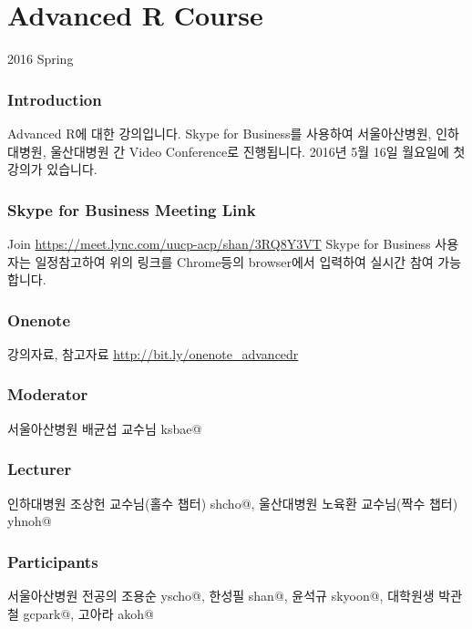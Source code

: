 \documentclass[]{article}
\title{}
\author{}
\date{}
\begin{document}
\section{Advanced R Course}\label{advanced-r-course}

2016 Spring

\subsubsection{Introduction}\label{introduction}

Advanced R에 대한 강의입니다. Skype for Business를 사용하여
서울아산병원, 인하대병원, 울산대병원 간 Video Conference로 진행됩니다.
2016년 5월 16일 월요일에 첫 강의가 있습니다.

\subsubsection{Skype for Business Meeting
Link}\label{skype-for-business-meeting-link}

Join \textbar{} \url{https://meet.lync.com/uucp-acp/shan/3RQ8Y3VT} Skype
for Business 사용자는 일정참고하여 위의 링크를 Chrome등의 browser에서
입력하여 실시간 참여 가능합니다.

\subsubsection{Onenote}\label{onenote}

강의자료, 참고자료 \url{http://bit.ly/onenote_advancedr}

\subsubsection{Moderator}\label{moderator}

서울아산병원 배균섭 교수님 ksbae@

\subsubsection{Lecturer}\label{lecturer}

인하대병원 조상헌 교수님(홀수 챕터) shcho@, 울산대병원 노육환
교수님(짝수 챕터) yhnoh@

\subsubsection{Participants}\label{participants}

서울아산병원 전공의 조용순 yscho@, 한성필 shan@, 윤석규 skyoon@,
대학원생 박관철 gcpark@, 고아라 akoh@
\end{document}

